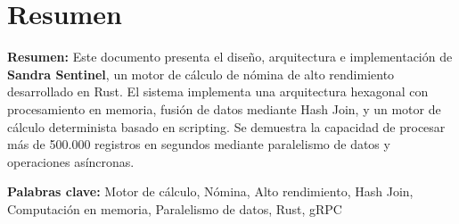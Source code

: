 \chapter*{Resumen}

\vspace{1cm}

\noindent\textbf{Resumen:} Este documento presenta el diseño, arquitectura e implementación de \textbf{Sandra Sentinel}, un motor de cálculo de nómina de alto rendimiento desarrollado en Rust. El sistema implementa una arquitectura hexagonal con procesamiento en memoria, fusión de datos mediante Hash Join, y un motor de cálculo determinista basado en scripting. Se demuestra la capacidad de procesar más de 500.000 registros en segundos mediante paralelismo de datos y operaciones asíncronas.

\vspace{1cm}

\noindent\textbf{Palabras clave:} Motor de cálculo, Nómina, Alto rendimiento, Hash Join, Computación en memoria, Paralelismo de datos, Rust, gRPC

\vfill
\newpage
